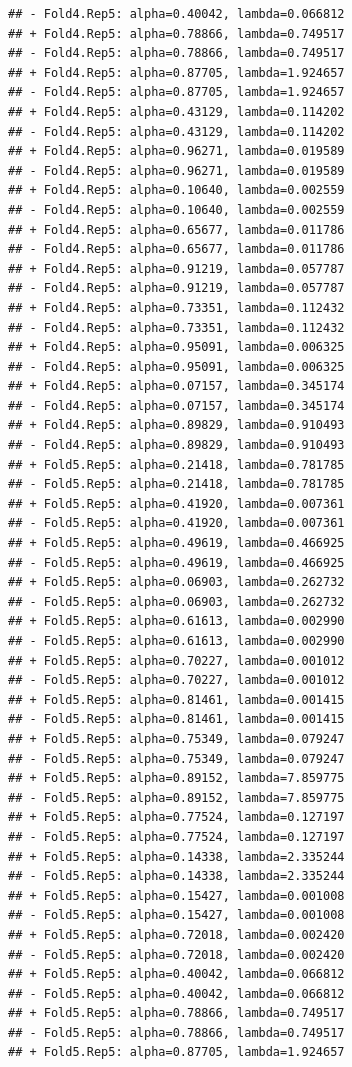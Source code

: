 \documentclass[
]{article}
\begin{document}
\begin{verbatim}
## - Fold4.Rep5: alpha=0.40042, lambda=0.066812 
## + Fold4.Rep5: alpha=0.78866, lambda=0.749517 
## - Fold4.Rep5: alpha=0.78866, lambda=0.749517 
## + Fold4.Rep5: alpha=0.87705, lambda=1.924657 
## - Fold4.Rep5: alpha=0.87705, lambda=1.924657 
## + Fold4.Rep5: alpha=0.43129, lambda=0.114202 
## - Fold4.Rep5: alpha=0.43129, lambda=0.114202 
## + Fold4.Rep5: alpha=0.96271, lambda=0.019589 
## - Fold4.Rep5: alpha=0.96271, lambda=0.019589 
## + Fold4.Rep5: alpha=0.10640, lambda=0.002559 
## - Fold4.Rep5: alpha=0.10640, lambda=0.002559 
## + Fold4.Rep5: alpha=0.65677, lambda=0.011786 
## - Fold4.Rep5: alpha=0.65677, lambda=0.011786 
## + Fold4.Rep5: alpha=0.91219, lambda=0.057787 
## - Fold4.Rep5: alpha=0.91219, lambda=0.057787 
## + Fold4.Rep5: alpha=0.73351, lambda=0.112432 
## - Fold4.Rep5: alpha=0.73351, lambda=0.112432 
## + Fold4.Rep5: alpha=0.95091, lambda=0.006325 
## - Fold4.Rep5: alpha=0.95091, lambda=0.006325 
## + Fold4.Rep5: alpha=0.07157, lambda=0.345174 
## - Fold4.Rep5: alpha=0.07157, lambda=0.345174 
## + Fold4.Rep5: alpha=0.89829, lambda=0.910493 
## - Fold4.Rep5: alpha=0.89829, lambda=0.910493 
## + Fold5.Rep5: alpha=0.21418, lambda=0.781785 
## - Fold5.Rep5: alpha=0.21418, lambda=0.781785 
## + Fold5.Rep5: alpha=0.41920, lambda=0.007361 
## - Fold5.Rep5: alpha=0.41920, lambda=0.007361 
## + Fold5.Rep5: alpha=0.49619, lambda=0.466925 
## - Fold5.Rep5: alpha=0.49619, lambda=0.466925 
## + Fold5.Rep5: alpha=0.06903, lambda=0.262732 
## - Fold5.Rep5: alpha=0.06903, lambda=0.262732 
## + Fold5.Rep5: alpha=0.61613, lambda=0.002990 
## - Fold5.Rep5: alpha=0.61613, lambda=0.002990 
## + Fold5.Rep5: alpha=0.70227, lambda=0.001012 
## - Fold5.Rep5: alpha=0.70227, lambda=0.001012 
## + Fold5.Rep5: alpha=0.81461, lambda=0.001415 
## - Fold5.Rep5: alpha=0.81461, lambda=0.001415 
## + Fold5.Rep5: alpha=0.75349, lambda=0.079247 
## - Fold5.Rep5: alpha=0.75349, lambda=0.079247 
## + Fold5.Rep5: alpha=0.89152, lambda=7.859775 
## - Fold5.Rep5: alpha=0.89152, lambda=7.859775 
## + Fold5.Rep5: alpha=0.77524, lambda=0.127197 
## - Fold5.Rep5: alpha=0.77524, lambda=0.127197 
## + Fold5.Rep5: alpha=0.14338, lambda=2.335244 
## - Fold5.Rep5: alpha=0.14338, lambda=2.335244 
## + Fold5.Rep5: alpha=0.15427, lambda=0.001008 
## - Fold5.Rep5: alpha=0.15427, lambda=0.001008 
## + Fold5.Rep5: alpha=0.72018, lambda=0.002420 
## - Fold5.Rep5: alpha=0.72018, lambda=0.002420 
## + Fold5.Rep5: alpha=0.40042, lambda=0.066812 
## - Fold5.Rep5: alpha=0.40042, lambda=0.066812 
## + Fold5.Rep5: alpha=0.78866, lambda=0.749517 
## - Fold5.Rep5: alpha=0.78866, lambda=0.749517 
## + Fold5.Rep5: alpha=0.87705, lambda=1.924657 

\end{verbatim}
\end{document}
